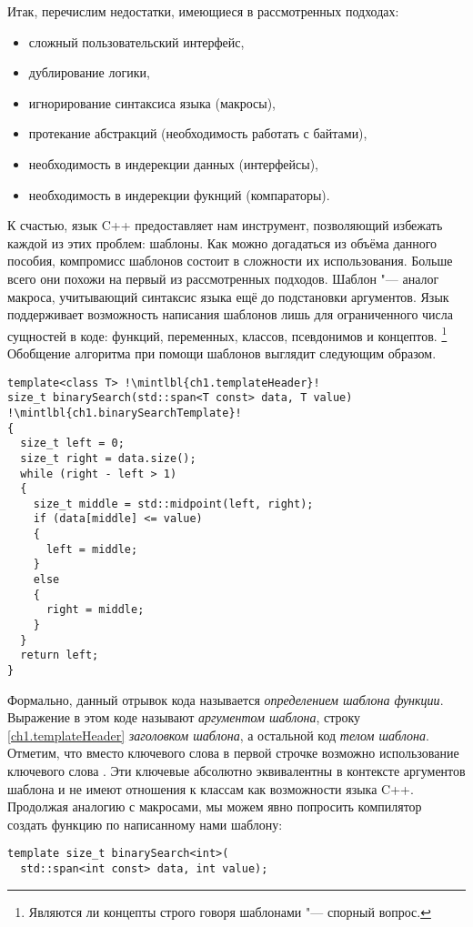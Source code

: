 Итак, перечислим недостатки, имеющиеся в рассмотренных подходах:
\begin{itemize}
\item сложный пользовательский интерфейс,
\item дублирование логики,
\item игнорирование синтаксиса языка (макросы),
\item протекание абстракций (необходимость работать с байтами),
\item необходимость в индерекции данных (интерфейсы),
\item необходимость в индерекции фукнций (компараторы).
\end{itemize}
К счастью, язык C++ предоставляет нам инструмент, позволяющий избежать каждой из этих проблем: шаблоны.
Как можно догадаться из объёма данного пособия, компромисс шаблонов состоит в сложности их использования.
Больше всего они похожи на первый из рассмотренных подходов.
Шаблон "--- аналог макроса, учитывающий синтаксис языка ещё до подстановки аргументов.
Язык поддерживает возможность написания шаблонов лишь для ограниченного числа сущностей в коде: функций, переменных, классов, псевдонимов и концептов.
\footnote{Являются ли концепты строго говоря шаблонами "--- спорный вопрос.}
Обобщение алгоритма  при помощи шаблонов выглядит следующим образом.
\begin{verbatim}
template<class T> !\mintlbl{ch1.templateHeader}!
size_t binarySearch(std::span<T const> data, T value) !\mintlbl{ch1.binarySearchTemplate}!
{
  size_t left = 0;
  size_t right = data.size();
  while (right - left > 1)
  {
    size_t middle = std::midpoint(left, right);
    if (data[middle] <= value)
    {
      left = middle;
    }
    else
    {
      right = middle;
    }
  }
  return left;
}
\end{verbatim}
Формально, данный отрывок кода называется \textit{определением шаблона функции}.
Выражение  в этом коде называют \textit{аргументом шаблона}, строку \ref{ch1.templateHeader} \textit{заголовком шаблона}, а остальной код \textit{телом шаблона}.
Отметим, что вместо ключевого слова  в первой строчке возможно использование ключевого слова .
Эти ключевые абсолютно эквивалентны в контексте аргументов шаблона и не имеют отношения к классам как возможности языка C++.
Продолжая аналогию с макросами, мы можем явно попросить компилятор создать функцию по написанному нами шаблону:
\begin{verbatim}
template size_t binarySearch<int>(
  std::span<int const> data, int value);
\end{verbatim}
